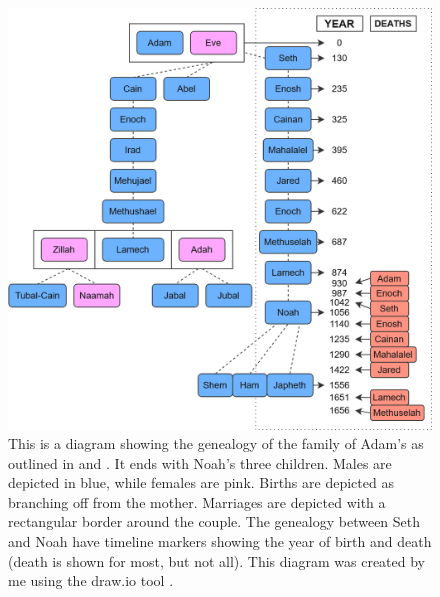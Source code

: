 \begin{figure}[htbp] %
  \centering
  \includegraphics[width=\linewidth]{images/genealogies/noahs_genealogy.png}
  \caption{This is a diagram showing the genealogy of the family of Adam's as outlined in  and . It ends with Noah's three children. Males are depicted in blue, while females are pink. Births are depicted as branching off from the mother. Marriages are depicted with a rectangular border around the couple. The genealogy between Seth and Noah have timeline markers showing the year of birth and death (death is shown for most, but not all). This diagram was created by me using the draw.io tool \cite{draw.io}.}
  \label{fig:noahs_genealogy}
\end{figure}